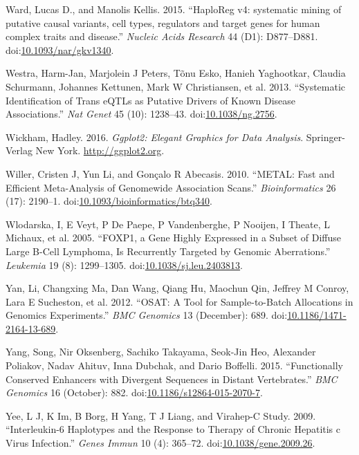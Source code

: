 \documentclass[]{DissertateOSU}
\begin{document}
\hypertarget{ref-haploreg}{}
Ward, Lucas D., and Manolis Kellis. 2015. ``HaploReg v4: systematic
mining of putative causal variants, cell types, regulators and target
genes for human complex traits and disease.'' \emph{Nucleic Acids
Research} 44 (D1): D877--D881.
doi:\href{https://doi.org/10.1093/nar/gkv1340}{10.1093/nar/gkv1340}.

\hypertarget{ref-westra_2013}{}
Westra, Harm-Jan, Marjolein J Peters, Tõnu Esko, Hanieh Yaghootkar,
Claudia Schurmann, Johannes Kettunen, Mark W Christiansen, et al. 2013.
``Systematic Identification of Trans eQTLs as Putative Drivers of Known
Disease Associations.'' \emph{Nat Genet} 45 (10): 1238--43.
doi:\href{https://doi.org/10.1038/ng.2756}{10.1038/ng.2756}.

\hypertarget{ref-ggplot2}{}
Wickham, Hadley. 2016. \emph{Ggplot2: Elegant Graphics for Data
Analysis}. Springer-Verlag New York. \url{http://ggplot2.org}.

\hypertarget{ref-metal}{}
Willer, Cristen J, Yun Li, and Gonçalo R Abecasis. 2010. ``METAL: Fast
and Efficient Meta-Analysis of Genomewide Association Scans.''
\emph{Bioinformatics} 26 (17): 2190--1.
doi:\href{https://doi.org/10.1093/bioinformatics/btq340}{10.1093/bioinformatics/btq340}.

\hypertarget{ref-Wlodarska_2005}{}
Wlodarska, I, E Veyt, P De Paepe, P Vandenberghe, P Nooijen, I Theate, L
Michaux, et al. 2005. ``FOXP1, a Gene Highly Expressed in a Subset of
Diffuse Large B-Cell Lymphoma, Is Recurrently Targeted by Genomic
Aberrations.'' \emph{Leukemia} 19 (8): 1299--1305.
doi:\href{https://doi.org/10.1038/sj.leu.2403813}{10.1038/sj.leu.2403813}.

\hypertarget{ref-OSAT}{}
Yan, Li, Changxing Ma, Dan Wang, Qiang Hu, Maochun Qin, Jeffrey M
Conroy, Lara E Sucheston, et al. 2012. ``OSAT: A Tool for
Sample-to-Batch Allocations in Genomics Experiments.'' \emph{BMC
Genomics} 13 (December): 689.
doi:\href{https://doi.org/10.1186/1471-2164-13-689}{10.1186/1471-2164-13-689}.

\hypertarget{ref-yang_2015}{}
Yang, Song, Nir Oksenberg, Sachiko Takayama, Seok-Jin Heo, Alexander
Poliakov, Nadav Ahituv, Inna Dubchak, and Dario Boffelli. 2015.
``Functionally Conserved Enhancers with Divergent Sequences in Distant
Vertebrates.'' \emph{BMC Genomics} 16 (October): 882.
doi:\href{https://doi.org/10.1186/s12864-015-2070-7}{10.1186/s12864-015-2070-7}.

\hypertarget{ref-yee_2009}{}
Yee, L J, K Im, B Borg, H Yang, T J Liang, and Virahep-C Study. 2009.
``Interleukin-6 Haplotypes and the Response to Therapy of Chronic
Hepatitis c Virus Infection.'' \emph{Genes Immun} 10 (4): 365--72.
doi:\href{https://doi.org/10.1038/gene.2009.26}{10.1038/gene.2009.26}.
\end{document}
